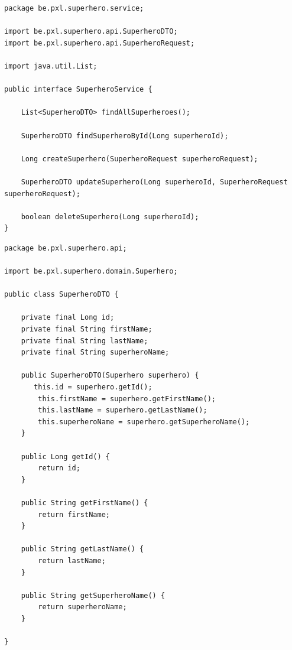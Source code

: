 \begin{lstlisting}[frame=single]
package be.pxl.superhero.service;

import be.pxl.superhero.api.SuperheroDTO;
import be.pxl.superhero.api.SuperheroRequest;

import java.util.List;

public interface SuperheroService {

	List<SuperheroDTO> findAllSuperheroes();

	SuperheroDTO findSuperheroById(Long superheroId);

	Long createSuperhero(SuperheroRequest superheroRequest);

	SuperheroDTO updateSuperhero(Long superheroId, SuperheroRequest superheroRequest);

	boolean deleteSuperhero(Long superheroId);
}
\end{lstlisting}


\begin{lstlisting}[frame=single]
package be.pxl.superhero.api;

import be.pxl.superhero.domain.Superhero;

public class SuperheroDTO {

	private final Long id;
	private final String firstName;
    private final String lastName;
    private final String superheroName;

    public SuperheroDTO(Superhero superhero) {
	   this.id = superhero.getId();
        this.firstName = superhero.getFirstName();
        this.lastName = superhero.getLastName();
        this.superheroName = superhero.getSuperheroName();
    }

	public Long getId() {
		return id;
	}

	public String getFirstName() {
        return firstName;
    }

    public String getLastName() {
        return lastName;
    }

    public String getSuperheroName() {
        return superheroName;
    }

}
\end{lstlisting}

